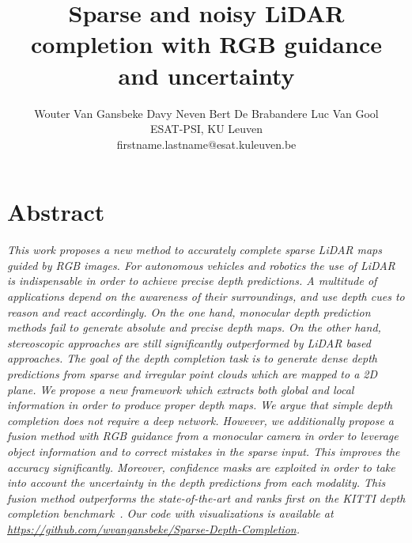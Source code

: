 \documentclass{main_style}
\begin{document}
\title{Sparse and noisy LiDAR completion with RGB guidance and uncertainty}

\author{Wouter Van Gansbeke \hspace{20pt} Davy Neven \hspace{20pt} Bert De Brabandere \hspace{20pt} Luc Van Gool\\
ESAT-PSI, KU Leuven\\
\small{firstname.lastname@esat.kuleuven.be}
}
\maketitle


\section*{\centering Abstract}
\textit{
 This work proposes a new method to accurately complete sparse LiDAR maps guided by RGB images. For autonomous vehicles and robotics the use of LiDAR is indispensable in order to achieve precise depth predictions. A multitude of applications depend on the awareness of their surroundings, and use depth cues to reason and react accordingly. On the one hand, monocular depth prediction methods fail to generate absolute and precise depth maps. On the other hand, stereoscopic approaches are still significantly outperformed by LiDAR based approaches. The goal of the depth completion task is to generate dense depth predictions from sparse and irregular point clouds which are mapped to a 2D plane. We propose a new framework which extracts both global and local information in order to produce proper depth maps. We argue that simple depth completion does not require a deep network. However, we additionally propose a fusion method with RGB guidance from a monocular camera in order to leverage object information and to correct mistakes in the sparse input. This improves the accuracy significantly. Moreover, confidence masks are exploited in order to take into account the uncertainty in the depth predictions from each modality. This fusion method outperforms the state-of-the-art and ranks first on the KITTI depth completion benchmark~\cite{kitti}. Our code with visualizations is available at \url{https://github.com/wvangansbeke/Sparse-Depth-Completion}.
}
\end{document}
